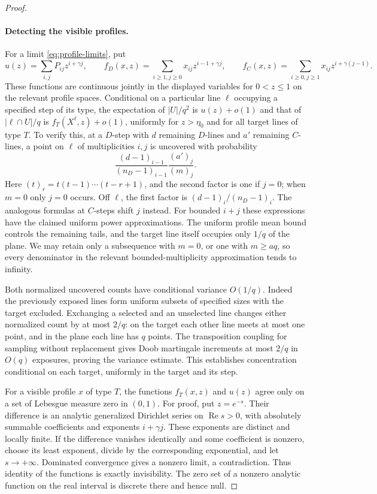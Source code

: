 \begin{proof}
\paragraph{Detecting the visible profiles.}
For a limit \eqref{eq:profile-limits}, put
\[
 u(z)=\sum_{i,j}P_{ij}z^{i+\gamma j},\qquad
 f_D(x,z)=\sum_{i\ge1,j\ge0}x_{ij}z^{i-1+\gamma j},\qquad
 f_C(x,z)=\sum_{i\ge0,j\ge1}x_{ij}z^{i+\gamma(j-1)}.
\]
These functions are continuous jointly in the displayed variables for
$0<z\le1$ on the relevant profile spaces.  Conditional on a particular
line $\ell$ occupying a specified step of its type, the expectation of
$|U|/q^2$ is $u(z)+o(1)$ and that of $|\ell\cap U|/q$ is
$f_T(X^\ell,z)+o(1)$, uniformly for $z>\eta_0$ and for all target lines of
type $T$.  To verify this, at a $D$-step with $d$ remaining $D$-lines and
$a'$ remaining $C$-lines, a point on $\ell$ of multiplicities $i,j$ is
uncovered with probability
\[
 \frac{(d-1)_{i-1}}{(n_D-1)_{i-1}}
 \frac{(a')_j}{(m)_j}.
\]
Here $(t)_r=t(t-1)\cdots(t-r+1)$, and the second factor is one if $j=0$;
when $m=0$ only $j=0$ occurs.  Off $\ell$, the first factor is
$(d-1)_i/(n_D-1)_i$.  The analogous formulas at $C$-steps shift $j$
instead.  For bounded $i+j$ these expressions have the claimed uniform
power approximations.  The uniform profile mean bound controls the
remaining tails, and the target line itself occupies only $1/q$ of the
plane.  We may retain only a subsequence with $m=0$, or one with $m\ge aq$,
so every denominator in the relevant bounded-multiplicity approximation
tends to infinity.

Both normalized uncovered counts have conditional variance $O(1/q)$.
Indeed the previously exposed lines form uniform subsets of specified
sizes with the target excluded.  Exchanging a selected and an unselected
line changes either normalized count by at most $2/q$: on the target
each other line meets at most one point, and in the plane each line has
$q$ points.  The transposition coupling for sampling without replacement
gives Doob martingale increments at most $2/q$ in $O(q)$ exposures, proving
the variance estimate.  This establishes concentration conditional on
each target, uniformly in the target and its step.

For a visible profile $x$ of type $T$, the functions $f_T(x,z)$ and $u(z)$
agree only on a set of Lebesgue measure zero in $(0,1)$.  For proof, put
$z=e^{-s}$.  Their difference is an analytic generalized Dirichlet series
on $\operatorname{Re}s>0$, with absolutely summable coefficients and
exponents $i+\gamma j$.  These exponents are distinct and locally finite.
If the difference vanishes identically and some coefficient is nonzero,
choose its least exponent, divide by the corresponding exponential, and
let $s\to+\infty$.  Dominated convergence gives a nonzero limit, a
contradiction.  Thus identity of the functions is exactly invisibility.
The zero set of a nonzero analytic function on the real interval is
discrete there and hence null.


\end{proof}
